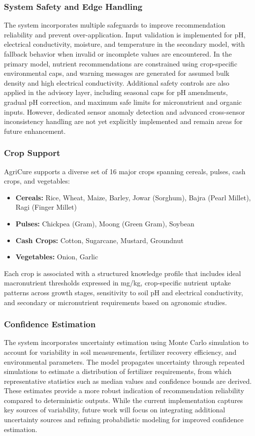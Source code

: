 \documentclass[conference]{IEEEtran}
\begin{document}
\subsubsection{System Safety and Edge Handling}
The system incorporates multiple safeguards to improve recommendation reliability and prevent over-application. Input validation is implemented for pH, electrical conductivity, moisture, and temperature in the secondary model, with fallback behavior when invalid or incomplete values are encountered. In the primary model, nutrient recommendations are constrained using crop-specific environmental caps, and warning messages are generated for assumed bulk density and high electrical conductivity. Additional safety controls are also applied in the advisory layer, including seasonal caps for pH amendments, gradual pH correction, and maximum safe limits for micronutrient and organic inputs. However, dedicated sensor anomaly detection and advanced cross-sensor inconsistency handling are not yet explicitly implemented and remain areas for future enhancement.

\subsubsection{Crop Support}
AgriCure supports a diverse set of 16 major crops spanning cereals, pulses, cash crops, and vegetables:
\begin{itemize}
\item \textbf{Cereals:} Rice, Wheat, Maize, Barley, Jowar (Sorghum), Bajra (Pearl Millet), Ragi (Finger Millet)
\item \textbf{Pulses:} Chickpea (Gram), Moong (Green Gram), Soybean
\item \textbf{Cash Crops:} Cotton, Sugarcane, Mustard, Groundnut
\item \textbf{Vegetables:} Onion, Garlic
\end{itemize}

Each crop is associated with a structured knowledge profile that includes ideal macronutrient thresholds expressed in mg/kg, crop-specific nutrient uptake patterns across growth stages, sensitivity to soil pH and electrical conductivity, and secondary or micronutrient requirements based on agronomic studies.

\subsubsection{Confidence Estimation}
The system incorporates uncertainty estimation using Monte Carlo simulation to account for variability in soil measurements, fertilizer recovery efficiency, and environmental parameters. The model propagates uncertainty through repeated simulations to estimate a distribution of fertilizer requirements, from which representative statistics such as median values and confidence bounds are derived. These estimates provide a more robust indication of recommendation reliability compared to deterministic outputs. While the current implementation captures key sources of variability, future work will focus on integrating additional uncertainty sources and refining probabilistic modeling for improved confidence estimation.
\end{document}
